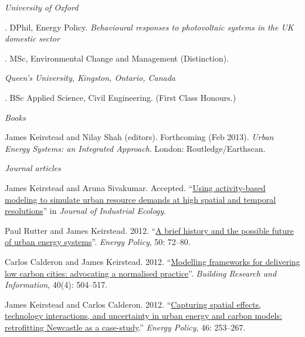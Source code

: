 \documentclass[11pt,a4paper]{article}
\begin{document}
\noindent{}%
%
\emph{University of Oxford \vspace{0.01in}}

.  DPhil, Energy Policy. \emph{Behavioural responses to photovoltaic systems in the UK domestic sector}

.  MSc, Environmental Change and Management (Distinction).

\medskip

\noindent\emph{Queen's University, Kingston, Ontario, Canada\vspace{0.02in}}

. BSc Applied Science, Civil Engineering. (First Class Honours.) 

\bigskip
 
\noindent{}%
%
\noindent\emph{Books \vspace{0.01in}}

\ind James Keirstead and Nilay Shah (editors). Forthcoming (Feb 2013). \emph{Urban Energy Systems: an Integrated Approach}. London: Routledge/Earthscan.

\bigskip

\emph{Journal articles \vspace{0.01in}} %
 

\ind James Keirstead and Aruna Sivakumar. Accepted. ``\href{http://dx.doi.org/10.1111/j.1530-9290.2012.00486.x}{Using activity-based modeling to simulate urban resource demands at high spatial and temporal resolutions}'' in \emph{Journal of Industrial Ecology}.

\ind Paul Rutter and James Keirstead.  2012. ``\href{http://dx.doi.org/10.1016/j.enpol.2012.03.072}{A brief history and the possible future of urban energy systems}''. \emph{Energy Policy}, 50: 72--80.

\ind Carlos Calderon and James Keirstead. 2012. ``\href{http://dx.doi.org/10.1080/09613218.2012.680702}{Modelling frameworks for delivering low carbon cities: advocating a normalised practice}''. \emph{Building Research and Information}, 40(4): 504--517.

\ind James Keirstead and Carlos Calderon.  2012. ``\href{http://dx.doi.org/10.1016/j.enpol.2012.03.058}{Capturing spatial effects, technology interactions, and uncertainty in urban energy and carbon models: retrofitting Newcastle as a case-study}.''  \emph{Energy Policy}, 46: 253--267.
\end{document}
